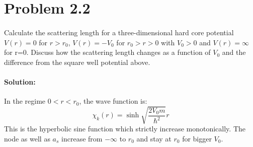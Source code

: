 \def\ahf{\alpha_{\mathrm{hf}}}
\def\muB{\mu_{\mathrm{B}}}
\def\gS{g_{\mathrm{S}}}
\def\muN{\mu_{\mathrm{N}}}
\def\gI{g_{\mathrm{I}}}

\section*{Problem 2.2}
\paragraph{} Calculate the scattering length for a three-dimensional hard core potential $V(r) = 0$ for $r>r_0$, $V(r) = -V_0$ for $r_0 > r>0$ with $V_0>0$ and $V(r) = \infty$ for r=0. Discuss how the scattering length changes as a function of $V_0$ and the difference from the square well potential above.
\paragraph{Solution:} 
In the regime $0<r<r_0$, the wave function is:
\begin{equation}
    \chi_k(r) = \sinh{\sqrt{\frac{2V_0m}{\hbar^2}}r}
\end{equation}
This is the hyperbolic sine function which strictly increase monotonically. The node as well as $a_s$ increase from $-\infty$ to $r_0$ and stay at $r_0$ for bigger $V_0$.








